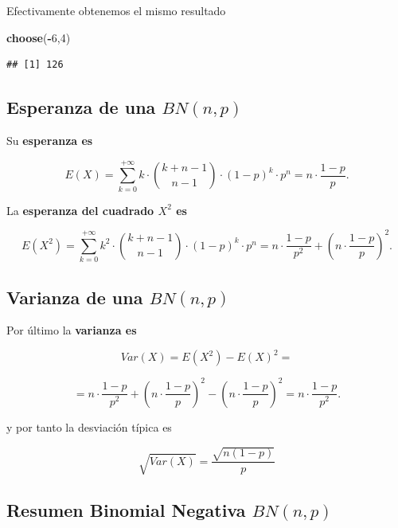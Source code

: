 \documentclass[]{book}
\newenvironment{Shaded}{\begin{snugshade}}{\end{snugshade}}
\newcommand{\DecValTok}[1]{\textcolor[rgb]{0.00,0.00,0.81}{#1}}
\newcommand{\KeywordTok}[1]{\textcolor[rgb]{0.13,0.29,0.53}{\textbf{#1}}}
\newcommand{\NormalTok}[1]{#1}
\newcommand{\OperatorTok}[1]{\textcolor[rgb]{0.81,0.36,0.00}{\textbf{#1}}}
\begin{document}
Efectivamente obtenemos el mismo resultado

\begin{Shaded}
\begin{Highlighting}[]
\KeywordTok{choose}\NormalTok{(}\OperatorTok{-}\DecValTok{6}\NormalTok{,}\DecValTok{4}\NormalTok{)}
\end{Highlighting}
\end{Shaded}

\begin{verbatim}
## [1] 126
\end{verbatim}

\hypertarget{esperanza-de-una-bnnp}{%
\subsection{\texorpdfstring{Esperanza de una \(BN(n,p)\)}{Esperanza de una BN(n,p)}}\label{esperanza-de-una-bnnp}}

Su \textbf{esperanza es}

\[E(X)=\displaystyle\sum_{k=0}^{+\infty} k\cdot {k+n-1\choose n-1} \cdot (1-p)^{k}\cdot p^n=n\cdot\frac{1-p}{p}.\]

La \textbf{esperanza del cuadrado \(X^2\) es}

\[E(X^2)=\displaystyle\sum_{k=0}^{+\infty} k^2\cdot {k+n-1\choose n-1} \cdot (1-p)^{k}\cdot p^n=n\cdot\frac{1-p}{p^2}+\left(n\cdot \frac{1-p}{p}\right)^2.\]

\hypertarget{varianza-de-una-bnnp}{%
\subsection{\texorpdfstring{Varianza de una \(BN(n,p)\)}{Varianza de una BN(n,p)}}\label{varianza-de-una-bnnp}}

Por último la \textbf{varianza es}

\[
Var(X)=E(X^2)-E(X)^2=
\]

\[=n\cdot \frac{1-p}{p^2}+\left(n\cdot \frac{1-p}{p}\right)^2-\left(n\cdot \frac{1-p}{p}\right)^2=
n\cdot \frac{1-p}{p^2}.\]

y por tanto la desviación típica es

\[\sqrt{Var(X)} = \frac{\sqrt{n(1-p)}}{p}\]

\hypertarget{resumen-binomial-negativa-bnnp}{%
\subsection{\texorpdfstring{Resumen Binomial Negativa \(BN(n,p)\)}{Resumen Binomial Negativa BN(n,p)}}\label{resumen-binomial-negativa-bnnp}}
\end{document}
